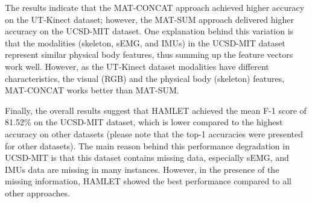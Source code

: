 \documentclass[runningheads]{llncs}
\newcommand{\pa}{HAMLET}
\begin{document}
\par The results indicate that the MAT-CONCAT approach achieved higher accuracy on the UT-Kinect dataset; however, the MAT-SUM approach delivered higher accuracy on the UCSD-MIT dataset. One explanation behind this variation is that the modalities (skeleton, sEMG, and IMUs) in the UCSD-MIT dataset represent similar physical body features, thus summing up the feature vectors work well. However, as the UT-Kinect dataset modalities have different characteristics, the visual (RGB) and the physical body (skeleton) features, MAT-CONCAT works better than MAT-SUM.

\par Finally, the overall results suggest that {\pa} achieved the mean F-1 score of 81.52\% on the UCSD-MIT dataset, which is lower compared to the highest accuracy on other datasets (please note that the top-1 accuracies were presented for other datasets). The main reason behind this performance degradation in UCSD-MIT is that this dataset contains missing data, especially sEMG, and IMUs data are missing in many instances. However, in the presence of the missing information, {\pa } showed the best performance compared to all other approaches.
\end{document}
